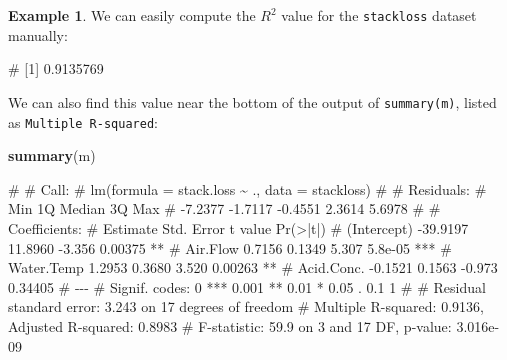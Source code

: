 \documentclass[
  a4paper,
]{article}
\newenvironment{Shaded}{\begin{snugshade}}{\end{snugshade}}
\newcommand{\AttributeTok}[1]{\textcolor[rgb]{0.13,0.29,0.53}{#1}}
\newcommand{\DecValTok}[1]{\textcolor[rgb]{0.00,0.00,0.81}{#1}}
\newcommand{\FunctionTok}[1]{\textcolor[rgb]{0.13,0.29,0.53}{\textbf{#1}}}
\newcommand{\NormalTok}[1]{#1}
\newcommand{\OtherTok}[1]{\textcolor[rgb]{0.56,0.35,0.01}{#1}}
\newcommand{\SpecialCharTok}[1]{\textcolor[rgb]{0.81,0.36,0.00}{\textbf{#1}}}
\theoremstyle{definition}
\theoremstyle{definition}
\newtheorem{example}{Example}[section]
\theoremstyle{definition}
\theoremstyle{definition}
\theoremstyle{remark}
\begin{document}
\begin{example}

We can easily compute the \(R^2\) value for the \texttt{stackloss} dataset
manually:

\begin{Shaded}
\end{Shaded}

\begin{Shaded}
\begin{Highlighting}[]
\NormalTok{\# [1] 0.9135769}
\end{Highlighting}
\end{Shaded}

We can also find this value near the bottom of the output of
\texttt{summary(m)}, listed as \texttt{Multiple\ R-squared}:

\begin{Shaded}
\begin{Highlighting}[]
\FunctionTok{summary}\NormalTok{(m)}
\end{Highlighting}
\end{Shaded}

\begin{Shaded}
\begin{Highlighting}[]
\NormalTok{\# }
\NormalTok{\# Call:}
\NormalTok{\# lm(formula = stack.loss \textasciitilde{} ., data = stackloss)}
\NormalTok{\# }
\NormalTok{\# Residuals:}
\NormalTok{\#     Min      1Q  Median      3Q     Max }
\NormalTok{\# {-}7.2377 {-}1.7117 {-}0.4551  2.3614  5.6978 }
\NormalTok{\# }
\NormalTok{\# Coefficients:}
\NormalTok{\#             Estimate Std. Error t value Pr(\textgreater{}|t|)    }
\NormalTok{\# (Intercept) {-}39.9197    11.8960  {-}3.356  0.00375 ** }
\NormalTok{\# Air.Flow      0.7156     0.1349   5.307  5.8e{-}05 ***}
\NormalTok{\# Water.Temp    1.2953     0.3680   3.520  0.00263 ** }
\NormalTok{\# Acid.Conc.   {-}0.1521     0.1563  {-}0.973  0.34405    }
\NormalTok{\# {-}{-}{-}}
\NormalTok{\# Signif. codes:  0 \textquotesingle{}***\textquotesingle{} 0.001 \textquotesingle{}**\textquotesingle{} 0.01 \textquotesingle{}*\textquotesingle{} 0.05 \textquotesingle{}.\textquotesingle{} 0.1 \textquotesingle{} \textquotesingle{} 1}
\NormalTok{\# }
\NormalTok{\# Residual standard error: 3.243 on 17 degrees of freedom}
\NormalTok{\# Multiple R{-}squared:  0.9136,  Adjusted R{-}squared:  0.8983 }
\NormalTok{\# F{-}statistic:  59.9 on 3 and 17 DF,  p{-}value: 3.016e{-}09}
\end{Highlighting}
\end{Shaded}

\end{example}
\end{document}
